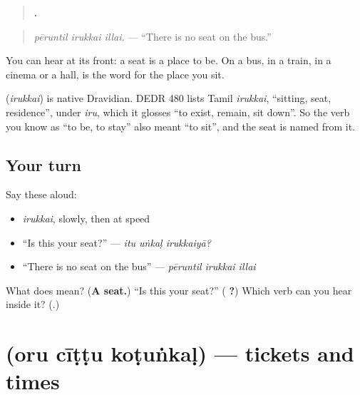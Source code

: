 \begin{quote}
\textbf{  .}
\end{quote}

\begin{quote}
\emph{pēruntil irukkai illai.} — \textquotedblleft{}There is no seat on the bus.\textquotedblright{}
\end{quote}

You can hear \textbf{} at its front: a seat is a place to be. On a bus, in a train, in a cinema or a hall, \textbf{} is the word for the place you sit.

\begin{cousinweb}
\textbf{} (\emph{irukkai}) is native Dravidian. DEDR 480 lists Tamil \emph{irukkai}, \textquotedblleft{}sitting, seat, residence\textquotedblright{}, under \emph{iru}, which it glosses \textquotedblleft{}to exist, remain, sit down\textquotedblright{}. So the verb you know as \textquotedblleft{}to be, to stay\textquotedblright{} also meant \textquotedblleft{}to sit\textquotedblright{}, and the seat is named from it.
\end{cousinweb}

\subsection*{Your turn}
Say these aloud:

\begin{itemize}
\raggedright
  \item \emph{irukkai}, slowly, then at speed
  \item \textquotedblleft{}Is this your seat?\textquotedblright{} — \emph{itu uṅkaḷ irukkaiyā?}
  \item \textquotedblleft{}There is no seat on the bus\textquotedblright{} — \emph{pēruntil irukkai illai}
\end{itemize}

\begin{tcolorbox}[breakable,colback=teal!4,colframe=teal!35!black,title={Before you move on}]
What does \textbf{} mean? (\textbf{A seat.}) \textquotedblleft{}Is this your seat?\textquotedblright{} (\textbf{  ?}) Which verb can you hear inside it? (\textbf{}.)
\end{tcolorbox}
\section[\texorpdfstring{\ta{ஒரு} \ta{சீட்டு} \ta{கொடுங்கள்} (oru cīṭṭu koṭuṅkaḷ)}{ஒரு சீட்டு கொடுங்கள் (oru cīṭṭu koṭuṅkaḷ)}]{   (oru cīṭṭu koṭuṅkaḷ) — tickets and times}

